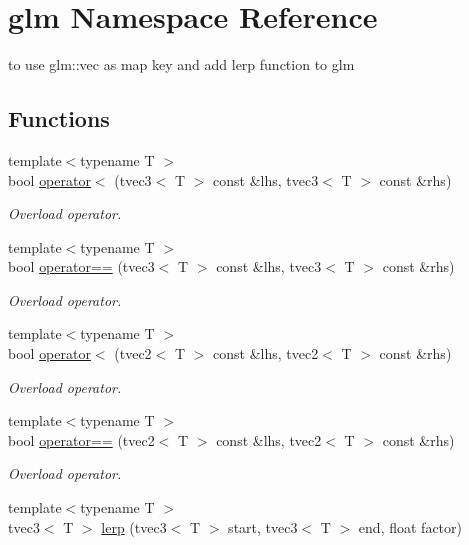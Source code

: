 \hypertarget{namespaceglm}{}\section{glm Namespace Reference}
\label{namespaceglm}


to use glm\+::vec as map key and add lerp function to glm  


\subsection*{Functions}
\begin{DoxyCompactItemize}
\item 
{\footnotesize template$<$typename T $>$ }\\bool \hyperlink{namespaceglm_ace58b08d9ba2d0b432012e484bd45339}{operator$<$} (tvec3$<$ T $>$ const \&lhs, tvec3$<$ T $>$ const \&rhs)
\begin{DoxyCompactList}\small\item\em Overload operator. \end{DoxyCompactList}\item 
{\footnotesize template$<$typename T $>$ }\\bool \hyperlink{namespaceglm_a1dac9453b69f23c1ede2c015709682ce}{operator==} (tvec3$<$ T $>$ const \&lhs, tvec3$<$ T $>$ const \&rhs)
\begin{DoxyCompactList}\small\item\em Overload operator. \end{DoxyCompactList}\item 
{\footnotesize template$<$typename T $>$ }\\bool \hyperlink{namespaceglm_aaf150b012be57b5af82289ee6976cde6}{operator$<$} (tvec2$<$ T $>$ const \&lhs, tvec2$<$ T $>$ const \&rhs)
\begin{DoxyCompactList}\small\item\em Overload operator. \end{DoxyCompactList}\item 
{\footnotesize template$<$typename T $>$ }\\bool \hyperlink{namespaceglm_a31c7ccd2daf98c24d28a01cd587a0f35}{operator==} (tvec2$<$ T $>$ const \&lhs, tvec2$<$ T $>$ const \&rhs)
\begin{DoxyCompactList}\small\item\em Overload operator. \end{DoxyCompactList}\item 
{\footnotesize template$<$typename T $>$ }\\tvec3$<$ T $>$ \hyperlink{namespaceglm_a83419436f77956f1d0f81fd54a5a5868}{lerp} (tvec3$<$ T $>$ start, tvec3$<$ T $>$ end, float factor)

\end{DoxyCompactItemize}
